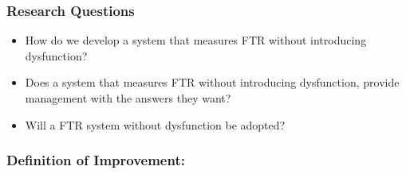 \subsubsection{Research Questions}
\begin{itemize}
\item{How do we develop a system that measures FTR without introducing
dysfunction?}
\item{Does a system that measures FTR without introducing dysfunction,
provide management with the answers they want?}
\item{Will a FTR system without dysfunction be adopted?}
\end{itemize}

\subsubsection{Definition of Improvement:}

